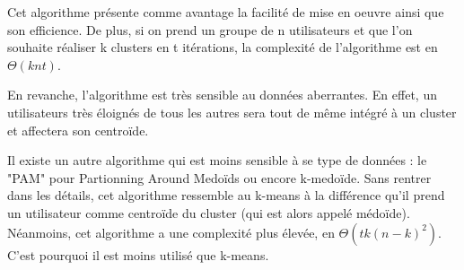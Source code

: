 Cet algorithme présente comme avantage la facilité de mise en oeuvre ainsi que son efficience. De plus, si on prend un groupe de n utilisateurs et que l'on souhaite réaliser k clusters en t itérations, la complexité de l'algorithme est en $\Theta(knt)$.\par
En revanche, l'algorithme est très sensible au données aberrantes. En effet, un utilisateurs très éloignés de tous les autres sera tout de même intégré à un cluster et affectera son centroïde.\par
Il existe un autre algorithme qui est moins sensible à se type de données : le "PAM" pour Partionning Around Medoïds ou encore k-medoïde. Sans rentrer dans les détails, cet algorithme ressemble au k-means à la différence qu'il prend un utilisateur comme centroïde du cluster (qui est alors appelé médoïde).
Néanmoins, cet algorithme a une complexité plus élevée, en $\Theta(tk(n-k)^2)$. C'est pourquoi il est moins utilisé que k-means.
